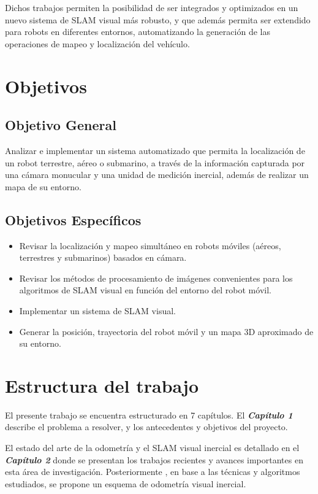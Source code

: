 Dichos trabajos permiten la posibilidad de ser integrados  y optimizados en un nuevo sistema de SLAM visual más robusto, y que además permita ser extendido para robots en diferentes entornos, automatizando la generación de las operaciones de mapeo y localización del vehículo.

\section{Objetivos}

\subsection{Objetivo General}

Analizar e implementar un sistema automatizado que permita la localización de un robot terrestre, aéreo o submarino, a través de la información capturada por una cámara monucular y una unidad de medición inercial, además de realizar un mapa de su entorno.

\subsection{Objetivos Específicos}

\begin{itemize}
	\item  Revisar la localización y mapeo simultáneo en robots móviles (aéreos, terrestres y submarinos) basados en cámara.
	\item Revisar los métodos de procesamiento de imágenes convenientes para los algoritmos de SLAM visual en función del entorno del robot móvil.
	\item Implementar un sistema de SLAM visual.
	\item Generar la posición, trayectoria del robot móvil y  un mapa 3D aproximado de su entorno.
\end{itemize}

\section{Estructura del trabajo}

El presente trabajo se encuentra estructurado en 7 capítulos. El \textit{\textbf{Capítulo 1}} describe el problema a resolver, y los antecedentes y objetivos del proyecto.

El estado del arte de la odometría y el SLAM visual inercial es detallado en el \textit{\textbf{Capítulo 2}} donde se presentan los trabajos recientes y avances importantes en esta área de investigación. Posteriormente , en base a las técnicas y algoritmos estudiados, se propone un esquema de odometría visual inercial.


